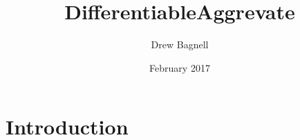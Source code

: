 \documentclass{article}
\title{DifferentiableAggrevate}
\author{Drew Bagnell}
\date{February 2017}
\begin{document}
\maketitle

\section{Introduction}
\end{document}

